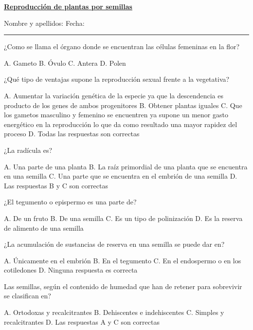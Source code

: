 \documentclass[11pt]{exam}
\newcommand\materia[1]{%
\parbox{\textwidth}{ \Large \sffamily \textbf{\uline{#1}}}\vspace{1em}}
\newcommand\nombrefecha{%
Nombre y apellidos:\hrulefill
Fecha:\rule{3.5cm}{0.4pt}\vspace{0.5em}}
\begin{document}
{\materia{Reproducción de plantas por semillas}

\nombrefecha

\begin{questions}
\question ¿Como se llama el órgano donde se encuentran las células femeninas en
  la flor?
  \begin{checkboxes}
    \choice A. Gameto
    \CorrectChoice B. Óvulo
    \choice C. Antera
    \choice D. Polen
  \end{checkboxes}
\question ¿Qué tipo de ventajas supone la reproducción sexual frente a la
  vegetativa?
  \begin{checkboxes}
    \CorrectChoice A. Aumentar la variación genética de la especie ya que la
    descendencia es producto de los genes de ambos progenitores
    \choice B. Obtener plantas iguales
    \choice C. Que los gametos masculino y femenino se encuentren ya supone 
    un menor gasto energético en la reproducción lo que da como resultado una
    mayor rapidez del proceso
    \choice D. Todas las respuestas son correctas 
  \end{checkboxes}
\question ¿La radícula es?
  \begin{checkboxes}
    \choice A. Una parte de una planta
    \choice B. La raíz primordial de una planta que se encuentra en una semilla
    \choice C. Una parte que se encuentra en el embrión de una semilla
    \CorrectChoice D. Las respuestas B y C son correctas
  \end{checkboxes}
\question ¿El tegumento o epispermo es una parte de?
  \begin{checkboxes}
    \choice A. De un fruto
    \CorrectChoice B. De una semilla
    \choice C. Es un tipo de polinización
    \choice D. Es la reserva de alimento de una semilla
  \end{checkboxes}
\question ¿La acumulación de sustancias de reserva en una semilla se puede dar
  en?
  \begin{checkboxes}
    \choice A. Únicamente en el embrión
    \choice B. En el tegumento
    \CorrectChoice C. En el endospermo o en los cotiledones
    \choice D. Ninguna respuesta es correcta 
  \end{checkboxes}
  \newpage
\question Las semillas, según el contenido de humedad que han de retener para
  sobrevivir se clasifican en?
  \begin{checkboxes}
    \CorrectChoice A. Ortodoxas y recalcitrantes
    \choice B. Dehiscentes e indehiscentes
    \choice C. Simples y recalcitrantes
    \choice D. Las respuestas A y C son correctas

\end{checkboxes}
\end{questions}}
\end{document}
